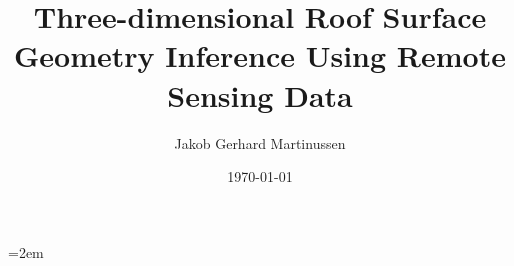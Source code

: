 \documentclass[american]{ntnuthesis}
\title{Three-dimensional Roof Surface Geometry Inference Using Remote Sensing Data}
\author{Jakob Gerhard Martinussen}
\date{\today}
\begin{document}
\setcounter{page}{3}

\begin{titlepage}
  \maketitle
\end{titlepage}




\cleardoublepage
\tableofcontents
\cleardoublepage
\listoffigures
\cleardoublepage
\listoftables
\cleardoublepage
\listoflistings








\chapter*{\bibname}
\emergencystretch=2em %
\printbibliography[heading=none]


\end{document}
